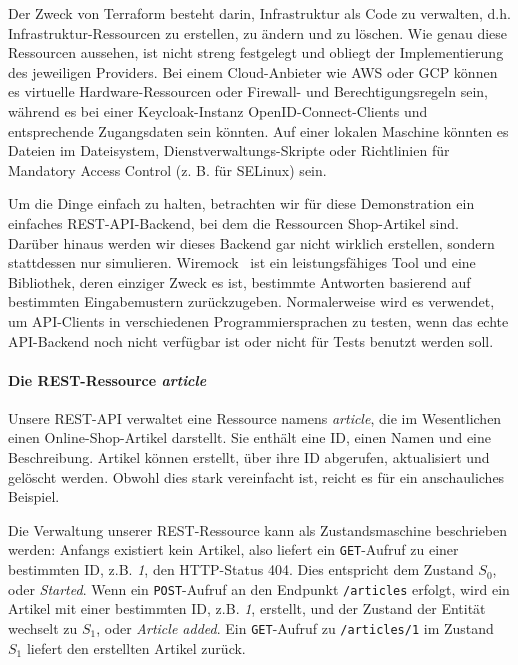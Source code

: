 \documentclass[paper=a4,11pt,numbers=noenddot]{article}
\begin{document}
Der Zweck von Terraform besteht darin, Infrastruktur als Code zu verwalten, d.h. Infrastruktur-Ressourcen zu erstellen, zu ändern und zu löschen. Wie genau diese Ressourcen aussehen, ist nicht streng festgelegt und obliegt der Implementierung des jeweiligen Providers. Bei einem Cloud-Anbieter wie AWS oder GCP können es virtuelle Hardware-Ressourcen oder Firewall- und Berechtigungsregeln sein, während es bei einer Keycloak-Instanz OpenID-Connect-Clients und entsprechende Zugangsdaten sein könnten. Auf einer lokalen Maschine könnten es Dateien im Dateisystem, Dienstverwaltungs-Skripte oder Richtlinien für Mandatory Access Control (z. B. für SELinux) sein.

Um die Dinge einfach zu halten, betrachten wir für diese Demonstration ein einfaches REST-API-Backend, bei dem die Ressourcen Shop-Artikel sind. Darüber hinaus werden wir dieses Backend gar nicht wirklich erstellen, sondern stattdessen nur simulieren. Wiremock~\autocite{noauthor_wiremock_nodate} ist ein leistungsfähiges Tool und eine Bibliothek, deren einziger Zweck es ist, bestimmte Antworten basierend auf bestimmten Eingabemustern zurückzugeben. Normalerweise wird es verwendet, um API-Clients in verschiedenen Programmiersprachen zu testen, wenn das echte API-Backend noch nicht verfügbar ist oder nicht für Tests benutzt werden soll.

\paragraph{Die REST-Ressource \emph{article}}

Unsere REST-API verwaltet eine Ressource namens \emph{article}, die im Wesentlichen einen Online-Shop-Artikel darstellt. Sie enthält eine ID, einen Namen und eine Beschreibung. Artikel können erstellt, über ihre ID abgerufen, aktualisiert und gelöscht werden. Obwohl dies stark vereinfacht ist, reicht es für ein anschauliches Beispiel.

Die Verwaltung unserer REST-Ressource kann als Zustandsmaschine beschrieben werden: Anfangs existiert kein Artikel, also liefert ein \verb'GET'-Aufruf zu einer bestimmten ID, z.B. \emph{1}, den HTTP-Status 404. Dies entspricht dem Zustand $S_0$, oder \emph{Started}. Wenn ein \verb'POST'-Aufruf an den Endpunkt \verb'/articles' erfolgt, wird ein Artikel mit einer bestimmten ID, z.B. \emph{1}, erstellt, und der Zustand der Entität wechselt zu $S_1$, oder \emph{Article added}. Ein \verb'GET'-Aufruf zu \verb'/articles/1' im Zustand $S_1$ liefert den erstellten Artikel zurück.
\end{document}
